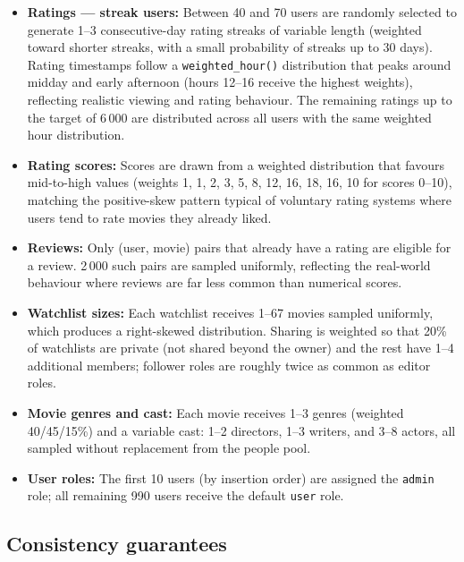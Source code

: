 \documentclass[11pt, a4paper]{article}
\begin{document}
\begin{itemize}
    \item \textbf{Ratings --- streak users:} Between 40 and 70 users are
    randomly selected to generate 1--3 consecutive-day rating streaks of
    variable length (weighted toward shorter streaks, with a small
    probability of streaks up to 30 days). Rating timestamps follow a
    \texttt{weighted\_hour()} distribution that peaks around midday and
    early afternoon (hours 12--16 receive the highest weights), reflecting
    realistic viewing and rating behaviour. The remaining ratings up to the
    target of 6\,000 are distributed across all users with the same
    weighted hour distribution.

    \item \textbf{Rating scores:} Scores are drawn from a weighted
    distribution that favours mid-to-high values
    (weights 1, 1, 2, 3, 5, 8, 12, 16, 18, 16, 10 for scores 0--10),
    matching the positive-skew pattern typical of voluntary rating systems
    where users tend to rate movies they already liked.

    \item \textbf{Reviews:} Only (user, movie) pairs that already have a
    rating are eligible for a review. 2\,000 such pairs are sampled
    uniformly, reflecting the real-world behaviour where reviews are far
    less common than numerical scores.

    \item \textbf{Watchlist sizes:} Each watchlist receives 1--67 movies
    sampled uniformly, which produces a right-skewed distribution. Sharing
    is weighted so that 20\% of watchlists are private (not shared beyond
    the owner) and the rest have 1--4 additional members; follower roles
    are roughly twice as common as editor roles.

    \item \textbf{Movie genres and cast:} Each movie receives 1--3 genres
    (weighted 40/45/15\%) and a variable cast: 1--2 directors, 1--3
    writers, and 3--8 actors, all sampled without replacement from the
    people pool.

    \item \textbf{User roles:} The first 10 users (by insertion order) are
    assigned the \texttt{admin} role; all remaining 990 users receive the
    default \texttt{user} role.
\end{itemize}

\subsection{Consistency guarantees}
\end{document}
